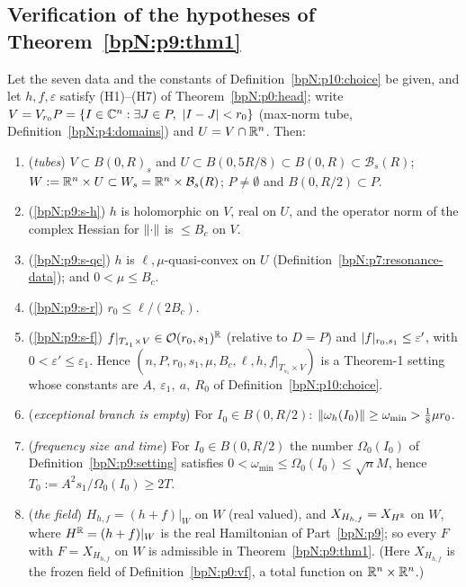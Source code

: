 \subsection{Verification of the hypotheses of Theorem~\ref{bpN:p9:thm1}}\label{bpN:p10:s-hyp}

\begin{proposition}\label{bpN:p10:hypotheses-check}
Let the seven data and the constants of Definition~\ref{bpN:p10:choice} be given, and let $h,f,\varepsilon$ satisfy (H1)--(H7) of Theorem~\ref{bpN:p0:head}; write $V=V_{r_0}P=\{I\in\C^n:\exists J\in P,\ \abs{I-J}<r_0\}$ (max-norm tube, Definition~\ref{bpN:p4:domains}) and $U=V\cap\mathbb{R}^n$. Then:
\begin{enumerate}[label=(\alph*)]
\item (\emph{tubes}) $V\subset B(0,R)_s$ and $U\subset B(0,5R/8)\subset B(0,R)\subset\mathcal B_s(R)$; $W:=\mathbb{R}^n\times U\subset W_s=\mathbb{R}^n\times\mathcal B_s(R)$; $P\ne\emptyset$ and $B(0,R/2)\subset P$.
\item (\ref{bpN:p9:s-h}) $h$ is holomorphic on $V$, real on $U$, and the operator norm of the complex Hessian for $\lVert \cdot\rVert$ is $\le B_c$ on $V$.
\item (\ref{bpN:p9:s-qc}) $h$ is $\ell,\mu$-quasi-convex on $U$ (Definition~\ref{bpN:p7:resonance-data}); and $0<\mu\le B_c$.
\item (\ref{bpN:p9:s-r}) $r_0\le\ell/(2B_c)$.
\item (\ref{bpN:p9:s-f}) $f|_{T_{s_1}\times V}\in\mathcal O(r_0,s_1)^{\mathbb{R}}$ (relative to $D=P$) and $\lvert f\rvert_{r_0,s_1}\le\varepsilon'$, with $0<\varepsilon'\le\varepsilon_1$.
Hence $(n,P,r_0,s_1,\mu,B_c,\ell,h,f|_{T_{s_1}\times V})$ is a Theorem-1 setting whose constants are $A,\ \varepsilon_1,\ a,\ R_0$ of Definition~\ref{bpN:p10:choice}.
\item (\emph{exceptional branch is empty}) For $I_0\in B(0,R/2)$: $\lVert \omega_h(I_0)\rVert\ge\omega_{\min}>\frac18\mu r_0$.
\item (\emph{frequency size and time}) For $I_0\in B(0,R/2)$ the number $\Omega_0(I_0)$ of Definition~\ref{bpN:p9:setting} satisfies $0<\omega_{\min}\le\Omega_0(I_0)\le\sqrt nM$, hence $T_0:=A^2s_1/\Omega_0(I_0)\ge2T$.
\item (\emph{the field}) $H_{h,f}=(h+f)|_W$ on $W$ (real valued), and $X_{H_{h,f}}=X_{H^{\mathbb{R}}}$ on $W$, where $H^{\mathbb{R}}=(h+f)|_W$ is the real Hamiltonian of Part~\ref{bpN:p9}; so every $F$ with $F=X_{H_{h,f}}$ on $W$ is admissible in Theorem~\ref{bpN:p9:thm1}. (Here $X_{H_{h,f}}$ is the frozen field of Definition~\ref{bpN:p0:vf}, a total function on $\mathbb{R}^n\times\mathbb{R}^n$.)
\end{enumerate}
\end{proposition}
